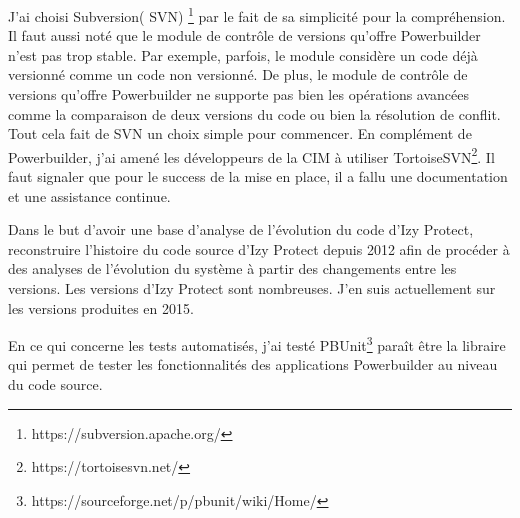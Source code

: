 \documentclass[a4paper]{article}
\begin{document}
J'ai choisi Subversion( SVN) \footnote{https://subversion.apache.org/} par le fait de sa simplicité pour la compréhension.
Il faut aussi noté que le module de contrôle de versions qu'offre Powerbuilder n'est pas trop stable. 
Par exemple, parfois, le module considère un code déjà versionné comme un code non versionné.
De plus, le module de contrôle de versions qu'offre Powerbuilder ne supporte pas bien les opérations avancées comme la comparaison de deux versions du code ou bien la résolution de conflit. 
Tout cela fait de SVN un choix simple pour commencer.
En complément de Powerbuilder, j'ai amené les développeurs de la CIM à utiliser TortoiseSVN\footnote{https://tortoisesvn.net/}.
Il faut signaler que pour le success de la mise en place, il a fallu une documentation et une assistance continue.

Dans le but d'avoir une base d'analyse de l'évolution du code d'Izy Protect, reconstruire l'histoire du code source d'Izy Protect depuis 2012 afin de procéder à des analyses de l'évolution du système à partir des changements entre les versions. 
Les versions d'Izy Protect sont nombreuses. J'en suis actuellement sur les versions produites en 2015.

En ce qui concerne les tests automatisés, j'ai testé PBUnit\footnote{https://sourceforge.net/p/pbunit/wiki/Home/}  paraît être la libraire qui permet de tester les fonctionnalités des applications Powerbuilder au niveau du code source. 
\end{document}
